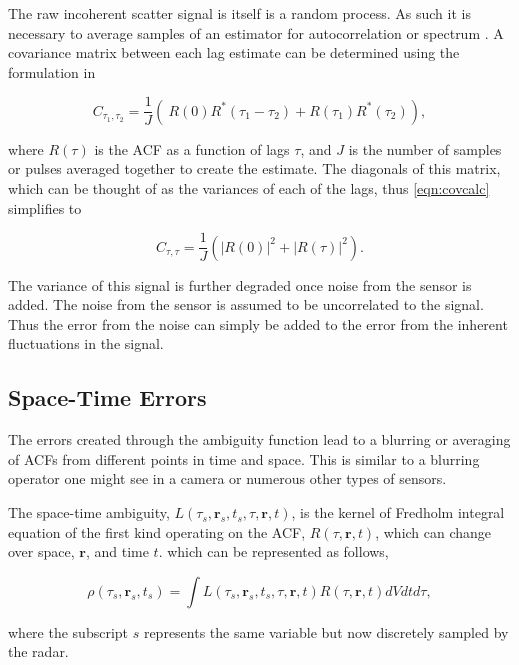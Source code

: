 \documentclass[draft,ras]{agutex}
\begin{document}
\begin{article}
The raw incoherent scatter signal is itself is a random process. As such it is necessary to average samples of an estimator for autocorrelation or spectrum \citep{Diaz:2008co}. A covariance matrix between each lag estimate can be determined using the formulation in \citep{hysell2008} 

\begin{equation}
\label{eqn:covcalc}
C_{\tau_1,\tau_2} = \frac{1}{J} \left( \ R(0)  R^*(\tau_1-\tau_2) +  R(\tau_1) R^*(\tau_2) \right),
\end{equation}

\noindent where $R(\tau)$ is the ACF as a function of lags $\tau$, and $J$ is the number of samples or pulses averaged together to create the estimate. The diagonals of this matrix, which can be thought of as the variances of each of the lags, thus \ref{eqn:covcalc} simplifies to

\begin{equation}
\label{eqn:covdiag}
C_{\tau,\tau} = \frac{1}{J} \left(  |R(0)|^2 +|R(\tau)|^2\right).
\end{equation}

The variance of this signal is further degraded once noise from the sensor is added. The noise from the sensor is assumed to be uncorrelated to the signal. Thus the error from the noise can simply be added to the error from the inherent fluctuations in the signal. 

\subsection{Space-Time Errors}

The errors created through the ambiguity function lead to a blurring or averaging of ACFs from different points in time and space. This is similar to a blurring operator one might see in a camera or numerous other types of sensors. 

The space-time ambiguity, $L(\tau_s,\mathbf{r}_s,t_s,\tau,\mathbf{r},t)$, is the kernel of Fredholm integral equation of the first kind operating on the ACF, $R(\tau,\mathbf{r},t)$, which can change over space, $\mathbf{r}$, and time $t$. which can be represented as follows,

 \begin{equation}
  \label{eqn:staf}
  \rho(\tau_s,\mathbf{r}_s,t_s) =\int L(\tau_s,\mathbf{r}_s,t_s,\tau,\mathbf{r},t)R(\tau,\mathbf{r},t)dVdtd\tau,
\end{equation}

\noindent where the subscript $s$ represents the same variable but now discretely sampled by the radar. 


\end{article}
\end{document}
